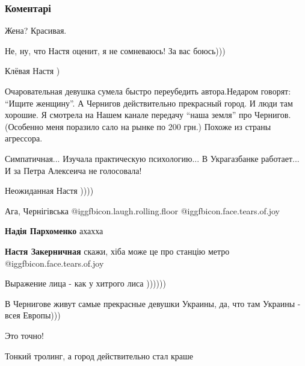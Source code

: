  
 
 
 
 
\subsubsection{Коментарі}

\begin{itemize} %
Жена? Красивая.

Не, ну, что Настя оценит, я не сомневаюсь!
За вас боюсь)))

Клёвая Настя )


Очаровательная девушка сумела быстро переубедить автора.Недаром говорят: \enquote{Ищите
женщину}. А Чернигов действительно прекрасный город. И люди там хорошие. Я
смотрела на Нашем канале передачу \enquote{наша земля} про Чернигов. (Особенно меня
поразило сало на рынке по 200 грн.) Похоже из страны агрессора.

Симпатичная... Изучала практическую психологию... В Украгазбанке работает... И за Петра Алексеича не голосовала!

Неожиданная Настя ))))

Ага, Чернігівська  @igg{fbicon.laugh.rolling.floor}  @igg{fbicon.face.tears.of.joy} 

\begin{itemize} %
\textbf{Надія Пархоменко} ахахха

\textbf{Настя Закерничная} скажи, хіба може це про станцію метро  @igg{fbicon.face.tears.of.joy} 
\end{itemize} %

Выражение лица - как у хитрого лиса ))))))

В Чернигове живут самые прекрасные девушки Украины, да, что там Украины - всея Европы)))

Это точно!

Тонкий тролинг, а город действительно стал краше


\end{itemize}
